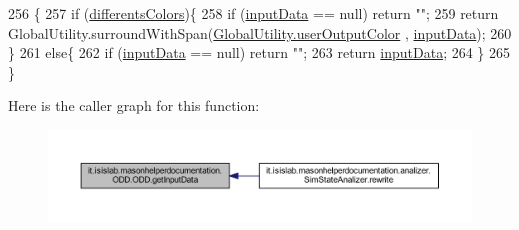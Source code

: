 \begin{DoxyCode}
256                                        \{
257         \textcolor{keywordflow}{if} (\hyperlink{classit_1_1isislab_1_1masonhelperdocumentation_1_1_o_d_d_1_1_o_d_d_ab09b176537cd5e168d67fc16112444dc}{differentsColors})\{
258             \textcolor{keywordflow}{if} (\hyperlink{classit_1_1isislab_1_1masonhelperdocumentation_1_1_o_d_d_1_1_o_d_d_a003e2cc245212d81de91896a8ce4f440}{inputData} == null) \textcolor{keywordflow}{return} \textcolor{stringliteral}{""};
259             \textcolor{keywordflow}{return} GlobalUtility.surroundWithSpan(\hyperlink{classit_1_1isislab_1_1masonhelperdocumentation_1_1analizer_1_1_global_utility_aec864cd710b27ece609c5a6093211ff4}{GlobalUtility.userOutputColor}
      , \hyperlink{classit_1_1isislab_1_1masonhelperdocumentation_1_1_o_d_d_1_1_o_d_d_a003e2cc245212d81de91896a8ce4f440}{inputData});
260         \}
261         \textcolor{keywordflow}{else}\{
262             \textcolor{keywordflow}{if} (\hyperlink{classit_1_1isislab_1_1masonhelperdocumentation_1_1_o_d_d_1_1_o_d_d_a003e2cc245212d81de91896a8ce4f440}{inputData} == null) \textcolor{keywordflow}{return} \textcolor{stringliteral}{""};
263             \textcolor{keywordflow}{return} \hyperlink{classit_1_1isislab_1_1masonhelperdocumentation_1_1_o_d_d_1_1_o_d_d_a003e2cc245212d81de91896a8ce4f440}{inputData};
264         \}
265     \}
\end{DoxyCode}


Here is the caller graph for this function\-:\nopagebreak
\begin{figure}[H]
\begin{center}
\leavevmode
\includegraphics[width=350pt]{classit_1_1isislab_1_1masonhelperdocumentation_1_1_o_d_d_1_1_o_d_d_adf8e82ba7854afdc0790d3b3032b930c_icgraph}
\end{center}
\end{figure}


